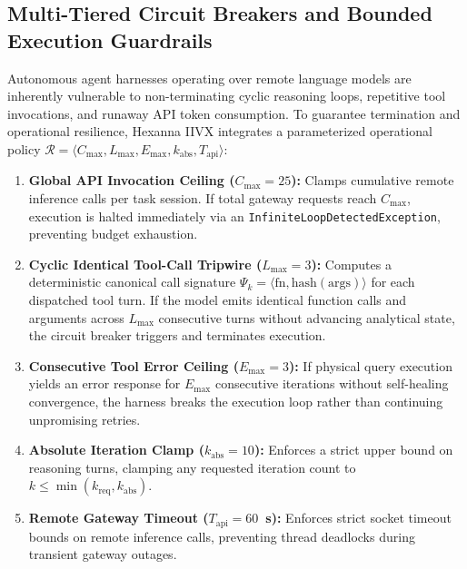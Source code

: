 \subsection{Multi-Tiered Circuit Breakers and Bounded Execution Guardrails}
Autonomous agent harnesses operating over remote language models are inherently vulnerable to non-terminating cyclic reasoning loops, repetitive tool invocations, and runaway API token consumption. To guarantee termination and operational resilience, Hexanna IIVX integrates a parameterized operational policy $\mathcal{R} = \langle C_{\max}, L_{\max}, E_{\max}, k_{\text{abs}}, T_{\text{api}} \rangle$:

\begin{enumerate}
    \item \textbf{Global API Invocation Ceiling ($C_{\max} = 25$):} Clamps cumulative remote inference calls per task session. If total gateway requests reach $C_{\max}$, execution is halted immediately via an \texttt{InfiniteLoopDetectedException}, preventing budget exhaustion.
    \item \textbf{Cyclic Identical Tool-Call Tripwire ($L_{\max} = 3$):} Computes a deterministic canonical call signature $\Psi_k = \langle \text{fn}, \text{hash}(\text{args}) \rangle$ for each dispatched tool turn. If the model emits identical function calls and arguments across $L_{\max}$ consecutive turns without advancing analytical state, the circuit breaker triggers and terminates execution.
    \item \textbf{Consecutive Tool Error Ceiling ($E_{\max} = 3$):} If physical query execution yields an error response for $E_{\max}$ consecutive iterations without self-healing convergence, the harness breaks the execution loop rather than continuing unpromising retries.
    \item \textbf{Absolute Iteration Clamp ($k_{\text{abs}} = 10$):} Enforces a strict upper bound on reasoning turns, clamping any requested iteration count to $k \le \min(k_{\text{req}}, k_{\text{abs}})$.
    \item \textbf{Remote Gateway Timeout ($T_{\text{api}} = 60$~s):} Enforces strict socket timeout bounds on remote inference calls, preventing thread deadlocks during transient gateway outages.
\end{enumerate}
